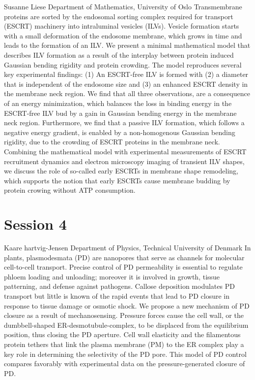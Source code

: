 \documentclass{article}
\begin{document}
{Susanne Liese}
{Department of Mathematics, University of Oslo}
{Transmembrane proteins are sorted by the endosomal sorting complex required for transport (ESCRT) machinery
into intraluminal vesicles (ILVs). Vesicle formation starts with a small deformation of the endosome membrane,
which grows in time and leads to the formation of an ILV. We present a minimal mathematical model that
describes ILV formation as a result of the interplay between protein induced Gaussian bending rigidity and
protein crowding. The model reproduces several key experimental findings: (1) An ESCRT-free ILV is formed with
(2) a diameter that is independent of the endosome size and (3) an enhanced ESCRT density in the membrane neck
region. We find that all three observations, are a consequence of an energy minimization, which balances the
loss in binding energy in the ESCRT-free ILV bud by a gain in Gaussian bending energy in the membrane neck
region. Furthermore, we find that a passive ILV formation, which follows a negative energy gradient, is
enabled by a non-homogenous Gaussian bending rigidity, due to the crowding of ESCRT proteins in the membrane
neck. Combining the mathematical model with experimental measurements of ESCRT recruitment dynamics and 
electron microscopy imaging of transient ILV shapes, we discuss the role of so-called early ESCRTs in membrane
shape remodeling, which supports the notion that early ESCRTs cause membrane budding by protein crowing
without ATP consumption.}

\newpage
\section*{Session 4}

{Kaare hartvig-Jensen}
{Department of Physics, Technical University of Denmark}
{In plants, plasmodesmata (PD) are nanopores that serve as channels for molecular
cell-to-cell transport. Precise control of PD permeability is essential to regulate phloem
loading and unloading; moreover it is involved in growth, tissue patterning, and defense
against pathogens. Callose deposition modulates PD transport but little is known of the
rapid events that lead to PD closure in response to tissue damage or osmotic shock. We
propose a new mechanism of PD closure as a result of mechanosensing. Pressure forces cause
the cell wall, or the dumbbell-shaped ER-desmotubule-complex, to be displaced from the
equilibrium position, thus closing the PD aperture. Cell wall elasticity and the
filamentous protein tethers that link the plasma membrane (PM) to the ER complex play a
key role in determining the selectivity of the PD pore. This model of PD control compares
favorably with experimental data on the pressure-generated closure of PD.}
\end{document}
